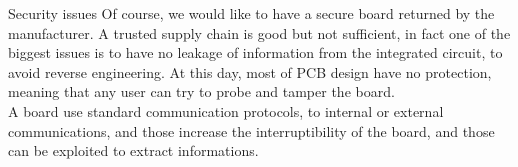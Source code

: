 \begin{section}{Security issues}
  Of course, we would like to have a secure board returned by the manufacturer. A trusted supply
  chain is good but not sufficient, in fact one of the biggest issues is to have no leakage of
  information from the integrated circuit, to avoid reverse engineering. At this day, most of PCB
  design have no protection, meaning that any user can try to probe and tamper the board.\\ 
  A board use standard communication protocols, to internal or external communications, and those
  increase the interruptibility of the board, and those can be exploited to extract informations.

\end{section}
